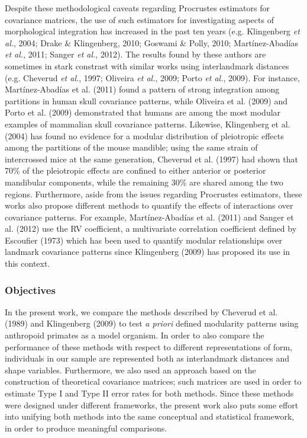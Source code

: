 \documentclass[12pt,twoside]{report}
\begin{document}
Despite these methodological caveats regarding Procrustes estimators for
covariance matrices, the use of such estimators for investigating
aspects of morphological integration has increased in the past ten years
(e.g. Klingenberg \emph{et al.}, 2004; Drake \& Klingenberg, 2010;
Goswami \& Polly, 2010; Martínez-Abadías \emph{et al.}, 2011; Sanger
\emph{et al.}, 2012). The results found by these authors are sometimes
in stark constrast with similar works using interlandmark distances
(e.g. Cheverud \emph{et al.}, 1997; Oliveira \emph{et al.}, 2009; Porto
\emph{et al.}, 2009). For instance, Martínez-Abadías et al. (2011) found
a pattern of strong integration among partitions in human skull
covariance patterns, while Oliveira et al. (2009) and Porto et al.
(2009) demonstrated that humans are among the most modular examples of
mammalian skull covariance patterns. Likewise, Klingenberg et al. (2004)
has found no evidence for a modular distribution of pleiotropic effects
among the partitions of the mouse mandible; using the same strain of
intercrossed mice at the same generation, Cheverud et al. (1997) had
shown that 70\% of the pleiotropic effects are confined to either
anterior or posterior mandibular components, while the remaining 30\%
are shared among the two regions. Furthermore, aside from the issues
regarding Procrustes estimators, these works also propose different
methods to quantify the effects of interactions over covariance
patterns. For example, Martínez-Abadías et al. (2011) and Sanger et al.
(2012) use the RV coefficient, a multivariate correlation coefficient
defined by Escoufier (1973) which has been used to quantify modular
relationships over landmark covariance patterns since Klingenberg (2009)
has proposed its use in this context.

\subsubsection{Objectives}\label{objectives}

In the present work, we compare the methods described by Cheverud et al.
(1989) and Klingenberg (2009) to test \emph{a priori} defined modularity
patterns using anthropoid primates as a model organism. In order to also
compare the performance of these methods with respect to different
representations of form, individuals in our sample are represented both
as interlandmark distances and shape variables. Furthermore, we also
used an approach based on the construction of theoretical covariance
matrices; such matrices are used in order to estimate Type I and Type II
error rates for both methods. Since these methods were designed under
different frameworks, the present work also puts some effort into
unifying both methods into the same conceptual and statistical
framework, in order to produce meaningful comparisons.
\end{document}
